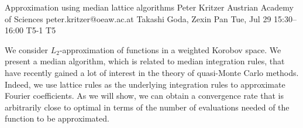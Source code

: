 \begin{talk}
  {Approximation using median lattice algorithms}%
  {Peter Kritzer}%
  {Austrian Academy of Sciences}%
  {peter.kritzer@oeaw.ac.at}%
  {Takashi Goda, Zexin Pan}%
  {}%
  {Tue, Jul 29 15:30–16:00}%
  {T5-1}%
  {T5}%
  
				
			
We consider $L_2$-approximation of functions in a weighted Korobov space. We present a median algorithm, which is related to median integration rules, that have recently gained a lot of interest in the theory of quasi-Monte Carlo methods. Indeed, we use lattice rules as the underlying integration rules to approximate Fourier coefficients. As we will show, we can obtain a convergence rate that is arbitrarily close to optimal in terms of the number of evaluations needed of the function to be approximated.
\end{talk}

